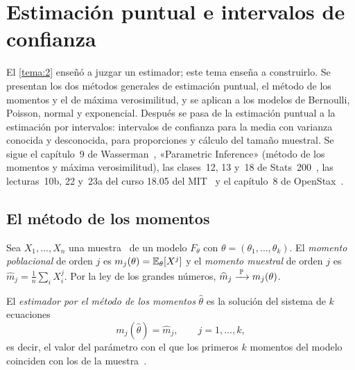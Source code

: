\chapter{Estimación puntual e intervalos de confianza}
\label{tema:4}

El \cref{tema:2} enseñó a juzgar un estimador; este tema enseña a construirlo. Se presentan los dos métodos generales de estimación puntual, el método de los momentos y el de máxima verosimilitud, y se aplican a los modelos de Bernoulli, Poisson, normal y exponencial. Después se pasa de la estimación puntual a la estimación por intervalos: intervalos de confianza para la media con varianza conocida y desconocida, para proporciones y cálculo del tamaño muestral. Se sigue el capítulo~9 de Wasserman~\cite{wasserman}, «Parametric Inference» (método de los momentos y máxima verosimilitud), las clases~12, 13 y~18 de Stats~200~\cite{stats200}, las lecturas~10b, 22 y~23a del curso 18.05 del MIT~\cite{mit1805} y el capítulo~8 de OpenStax~\cite{openstax}.

\section{El método de los momentos}

Sea $X_1,\dots,X_n$ una muestra \iid\ de un modelo $F_\theta$ con $\theta=(\theta_1,\dots,\theta_k)$. El \emph{momento poblacional} de orden $j$ es $m_j(\theta)=\mathbb{E}_\theta[X^{j}]$ y el \emph{momento muestral} de orden $j$ es $\widehat m_j=\frac1n\sum_iX_i^{j}$. Por la ley de los grandes números, $\widehat m_j\xrightarrow{\;\mathbb{P}\;} m_j(\theta)$.

\begin{definicion}\label{def:t4-momentos}
El \emph{estimador por el método de los momentos} $\widehat\theta$ es la solución del sistema de $k$ ecuaciones
\[
m_j(\widehat\theta)=\widehat m_j,\qquad j=1,\dots,k,
\]
es decir, el valor del parámetro con el que los primeros $k$ momentos del modelo coinciden con los de la muestra~\cite[cap.~9]{wasserman}.
\end{definicion}


